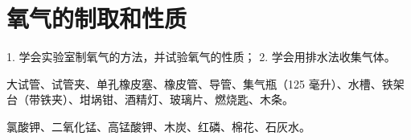 \section{氧气的制取和性质}\label{sec:xssy-sy3}

\begin{shiyanmudi}
    1. 学会实验室制氧气的方法，并试验氧气的性质； 2. 学会用排水法收集气体。
\end{shiyanmudi}


\begin{shiyanyongpin}
    大试管、试管夹、单孔橡皮塞、橡皮管、导管、集气瓶（125 毫升）、水槽、铁架台（带铁夹）、坩埚钳、酒精灯、玻璃片、燃烧匙、木条。

    氯酸钾、二氧化锰、高锰酸钾、木炭、红磷、棉花、石灰水。
\end{shiyanyongpin}

